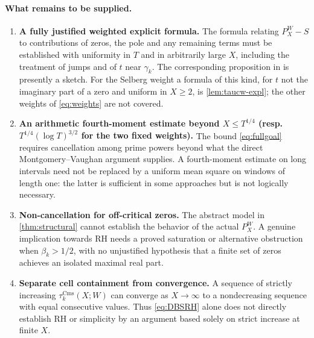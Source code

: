 \documentclass[11pt,a4paper]{article}
\numberwithin{equation}{section}
\theoremstyle{definition}
\theoremstyle{remark}
\newcommand{\Cms}{\mathrm{Cms}}
\begin{document}
\paragraph{What remains to be supplied.}
\begin{enumerate}[leftmargin=*,itemsep=4pt]
\item \textbf{A fully justified weighted explicit formula.} The formula relating $P_X^W-S$ to contributions of zeros, the pole and any remaining terms must be established with uniformity in $T$ and in arbitrarily large $X$, including the treatment of jumps and of $t$ near $\gamma_k$. The corresponding proposition in \cite{CasanaDBSRH} is presently a sketch. For the Selberg weight a formula of this kind, for $t$ not the imaginary part of a zero and uniform in $X\ge2$, is \cref{lem:taucw-expl}; the other weights of \eqref{eq:weights} are not covered.
\item \textbf{An arithmetic fourth-moment estimate beyond $X\le T^{1/4}$ (resp.\ $T^{1/4}(\log T)^{3/2}$ for the two fixed weights).} The bound \eqref{eq:fullgoal} requires cancellation among prime powers beyond what the direct Montgomery--Vaughan argument supplies. A fourth-moment estimate on long intervals need not be replaced by a uniform mean square on windows of length one: the latter is sufficient in some approaches but is not logically necessary.
\item \textbf{Non-cancellation for off-critical zeros.} The abstract model in \cref{thm:structural} cannot establish the behavior of the actual $P_X^W$. A genuine implication towards RH needs a proved saturation or alternative obstruction when $\beta_k>1/2$, with no unjustified hypothesis that a finite set of zeros achieves an isolated maximal real part.
\item \textbf{Separate cell containment from convergence.} A sequence of strictly increasing $\tau_k^{\Cms}(X;W)$ can converge as $X\to\infty$ to a nondecreasing sequence with equal consecutive values. Thus \eqref{eq:DBSRH} alone does not directly establish RH or simplicity by an argument based solely on strict increase at finite $X$.
\end{enumerate}
\end{document}
